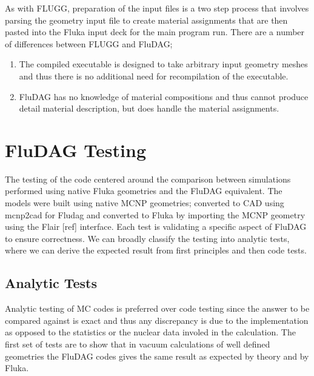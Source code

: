 \documentclass{anstrans}
\begin{document}
As with FLUGG, preparation of the input files is a two step process
that involves parsing the geometry input file to create material
assignments that are then pasted into the Fluka input deck for the main
program run.  There are a number of differences between FLUGG and FluDAG;
\begin{enumerate}
\item{The compiled executable is designed to take arbitrary input geometry meshes 
and thus there is no additional need for recompilation of the executable.}
\item{FluDAG has no knowledge of material compositions and thus cannot produce
detail material description, but does handle the material assignments.}
\end{enumerate}

\section{FluDAG Testing}
The testing of the code centered around the comparison between
simulations performed using native Fluka geometries and the FluDAG
equivalent. The models were built using native MCNP geometries;
converted to CAD using mcnp2cad for Fludag and converted to Fluka by
importing the MCNP geometry using the Flair [ref] interface. Each test
is validating a specific aspect of FluDAG to ensure correctness. We
can broadly classify the testing into analytic tests, where we can
derive the expected result from first principles and then code tests.

\subsection{Analytic Tests}
Analytic testing of MC codes is preferred over code testing since the
answer to be compared against is exact and thus any discrepancy is due
to the implementation as opposed to the statistics or the nuclear data
involed in the calculation. The first set of tests are to show that in
vacuum calculations of well defined geometries the FluDAG codes gives
the same result as expected by theory and by Fluka.
\end{document}
